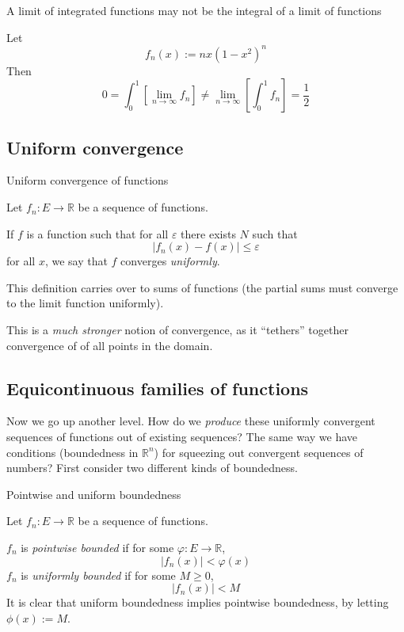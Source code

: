 \begin{example} A limit of integrated functions may not be the integral of a limit of functions

    Let 
    \[f_n(x) := n x(1-x^2)^n\]
    Then
    \[0 = \int_0^1 \left[\lim_{n \to \infty} f_n \right] \neq \lim_{n \to \infty} \left[\int_0^1 f_n \right] = \frac{1}{2} \]
\end{example}

\subsection{Uniform convergence}

\begin{definition} Uniform convergence of functions

    Let $f_n: E \rightarrow \mathbb{R}$ be a sequence of functions. 

    If $f$ is a function such that for all $\varepsilon$ there exists $N$ such that
    \[|f_n(x) - f(x)| \leq \varepsilon\]
    for all $x$, we say that $f$ converges \textit{uniformly}.
\end{definition}

    This definition carries over to sums of functions (the partial sums must converge to the limit function uniformly).

This is a \textit{much stronger} notion of convergence, as it ``tethers'' together convergence of of all points in the domain. 

\subsection{Equicontinuous families of functions}

Now we go up another level. How do we \textit{produce} these uniformly convergent sequences of functions out of existing sequences? The same way we have conditions (boundedness in $\mathbb{R}^n$) for squeezing out convergent sequences of numbers? First consider two different kinds of boundedness.

\begin{definition}Pointwise and uniform boundedness
    
    Let $f_n: E \rightarrow \mathbb{R}$ be a sequence of functions.

    $f_n$ is \textit{pointwise bounded} if for some $\varphi: E \rightarrow \mathbb{R}$,
    \[|f_n(x)| < \varphi(x)\]
    $f_n$ is \textit{uniformly bounded} if for some $M \geq 0$,
    \[|f_n(x)| < M\]
    It is clear that uniform boundedness implies pointwise boundedness, by letting $\phi(x) := M$.
\end{definition}

